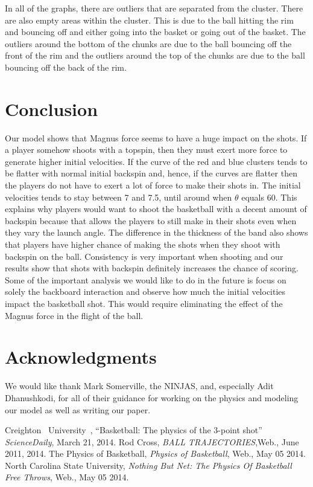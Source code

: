 \documentclass[twocolumn]{IEEEtran}
\begin{document}
In all of the graphs, there are outliers that are separated from the cluster. There are also empty areas within the cluster. This is due to the ball hitting the rim and bouncing off and either going into the basket or going out of the basket. The outliers around the bottom of the chunks are due to the ball bouncing off the front of the rim and the outliers around the top of the chunks are due to the ball bouncing off the back of the rim.


\section{Conclusion}

Our model shows that Magnus force seems to have a huge impact on the shots. If a player somehow shoots with a topspin, then they must exert more force to generate higher initial velocities. If the curve of the red and blue clusters tends to be flatter with normal initial backspin and, hence, if the curves are flatter then the players do not have to exert a lot of force to make their shots in. The initial velocities tends to stay between 7 and 7.5, until around when $\theta$ equals 60. This explains why players would want to shoot the basketball with a decent amount of backspin because that allows the players to still make in their shots even when they vary the launch angle. The difference in the thickness of the band also shows that players have higher chance of making the shots when they shoot with backspin on the ball. Consistency is very important when shooting and our results show that shots with backspin definitely increases the chance of scoring. Some of the important analysis we would like to do in the future is focus on solely the backboard interaction and observe how much the initial velocities impact the basketball shot. This would require eliminating the effect of the Magnus force in the flight of the ball.


\section*{Acknowledgments}
We would like thank Mark Somerville, the NINJAS, and, especially Adit Dhanushkodi, for all of their guidance for working on the physics and modeling our model as well as writing our paper. 

\nocite{*}


\begin{thebibliography}{1}
 Creighton \ University\ , ``Basketball: The physics of the 3-point shot''  {\it ScienceDaily}, March 21, 2014.
 Rod Cross, {\it BALL TRAJECTORIES},Web., June 2011, 2014.
 The Physics of Basketball, {\it Physics of Basketball}, Web., May 05 2014.
 North Carolina State University, {\it Nothing But Net: The Physics Of Basketball Free Throws}, Web., May 05 2014.
\end{thebibliography}
\end{document}
